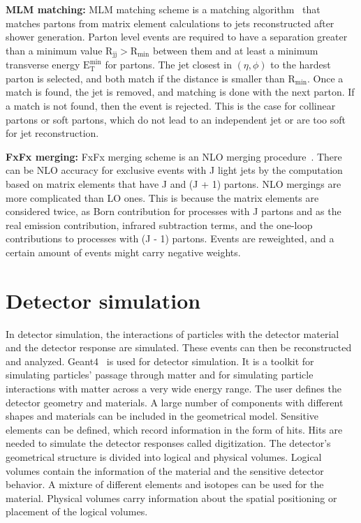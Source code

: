 \textbf{MLM matching:} MLM matching scheme is a matching algorithm~\cite{Mangano:2001xp, Mangano:2002ea} that matches partons from matrix element calculations to jets reconstructed after shower generation. Parton level events are required to have a separation greater than a minimum value $\text{R}_{\text{jj}} > \text{R}_{\text{min}}$ between them and at least a minimum transverse energy $\text{E}^{\text{min}}_{\text{T}}$ for partons. The jet closest in $(\eta, \phi)$ to the hardest parton is selected, and both match if the distance is smaller than $\text{R}_{\text{min}}$. Once a match is found, the jet is removed, and matching is done with the next parton. If a match is not found, then the event is rejected. This is the case for collinear partons or soft partons, which do not lead to an independent jet or are too soft for jet reconstruction.

\textbf{FxFx merging:} FxFx merging scheme is an NLO merging procedure~\cite{Frederix:2012ps}. There can be NLO accuracy for exclusive events with J light jets by the computation based on matrix elements that have J and (J + 1) partons. NLO mergings are more complicated than LO ones. This is because the matrix elements are considered twice, as Born contribution for processes with J partons and as the real emission contribution, infrared subtraction terms, and the one-loop contributions to processes with (J - 1) partons. Events are reweighted, and a certain amount of events might carry negative weights.


\section{Detector simulation}

In detector simulation, the interactions of particles with the detector material and the detector response are simulated. These events can then be reconstructed and analyzed. Geant4~\cite{Agostinelli:2002hh} is used for detector simulation. It is a toolkit for simulating particles' passage through matter and for simulating particle interactions with matter across a very wide energy range. The user defines the detector geometry and materials. A large number of components with different shapes and materials can be included in the geometrical model. Sensitive elements can be defined, which record information in the form of hits. Hits are needed to simulate the detector responses called digitization. The detector's geometrical structure is divided into logical and physical volumes. Logical volumes contain the information of the material and the sensitive detector behavior. A mixture of different elements and isotopes can be used for the material. Physical volumes carry information about the spatial positioning or placement of the logical volumes.

